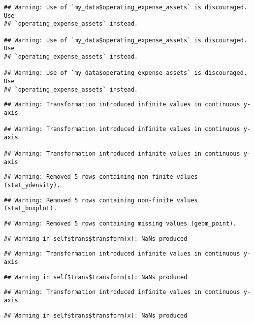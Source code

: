 \documentclass[a4paper,nobind]{templates/ociamthesis}
\begin{document}
\begin{landscape}
\begin{verbatim}
## Warning: Use of `my_data$operating_expense_assets` is discouraged. Use
## `operating_expense_assets` instead.

## Warning: Use of `my_data$operating_expense_assets` is discouraged. Use
## `operating_expense_assets` instead.

## Warning: Use of `my_data$operating_expense_assets` is discouraged. Use
## `operating_expense_assets` instead.
\end{verbatim}

\begin{verbatim}
## Warning: Transformation introduced infinite values in continuous y-axis

## Warning: Transformation introduced infinite values in continuous y-axis

## Warning: Transformation introduced infinite values in continuous y-axis
\end{verbatim}

\begin{verbatim}
## Warning: Removed 5 rows containing non-finite values (stat_ydensity).
\end{verbatim}

\begin{verbatim}
## Warning: Removed 5 rows containing non-finite values (stat_boxplot).
\end{verbatim}

\begin{verbatim}
## Warning: Removed 5 rows containing missing values (geom_point).
\end{verbatim}

\begin{verbatim}
## Warning in self$trans$transform(x): NaNs produced
\end{verbatim}

\begin{verbatim}
## Warning: Transformation introduced infinite values in continuous y-axis
\end{verbatim}

\begin{verbatim}
## Warning in self$trans$transform(x): NaNs produced
\end{verbatim}

\begin{verbatim}
## Warning: Transformation introduced infinite values in continuous y-axis
\end{verbatim}

\begin{verbatim}
## Warning in self$trans$transform(x): NaNs produced
\end{verbatim}


\end{landscape}
\end{document}
